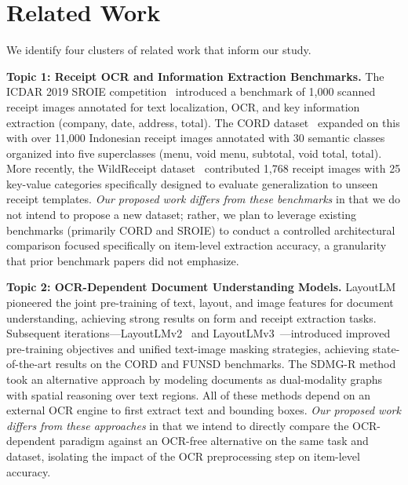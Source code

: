 \documentclass[9pt,twocolumn,twoside]{extarticle}
\begin{document}
\section{Related Work}
\label{sec:related}

We identify four clusters of related work that inform our study.

\smallskip\noindent\textbf{Topic 1: Receipt OCR and Information Extraction Benchmarks.}
The ICDAR 2019 SROIE competition~\cite{huang2019sroie} introduced a benchmark of 1{,}000 scanned receipt images annotated for text localization, OCR, and key information extraction (company, date, address, total). The CORD dataset~\cite{park2019cord} expanded on this with over 11{,}000 Indonesian receipt images annotated with 30 semantic classes organized into five superclasses (menu, void menu, subtotal, void total, total). More recently, the WildReceipt dataset~\cite{sun2021sdmgr} contributed 1{,}768 receipt images with 25 key-value categories specifically designed to evaluate generalization to unseen receipt templates. \emph{Our proposed work differs from these benchmarks} in that we do not intend to propose a new dataset; rather, we plan to leverage existing benchmarks (primarily CORD and SROIE) to conduct a controlled architectural comparison focused specifically on item-level extraction accuracy, a granularity that prior benchmark papers did not emphasize.

\smallskip\noindent\textbf{Topic 2: OCR-Dependent Document Understanding Models.}
LayoutLM~\cite{xu2020layoutlm} pioneered the joint pre-training of text, layout, and image features for document understanding, achieving strong results on form and receipt extraction tasks. Subsequent iterations---LayoutLMv2~\cite{xu2021layoutlmv2} and LayoutLMv3~\cite{huang2022layoutlmv3}---introduced improved pre-training objectives and unified text-image masking strategies, achieving state-of-the-art results on the CORD and FUNSD benchmarks. The SDMG-R method~\cite{sun2021sdmgr} took an alternative approach by modeling documents as dual-modality graphs with spatial reasoning over text regions. All of these methods depend on an external OCR engine to first extract text and bounding boxes. \emph{Our proposed work differs from these approaches} in that we intend to directly compare the OCR-dependent paradigm against an OCR-free alternative on the same task and dataset, isolating the impact of the OCR preprocessing step on item-level accuracy.
\end{document}
